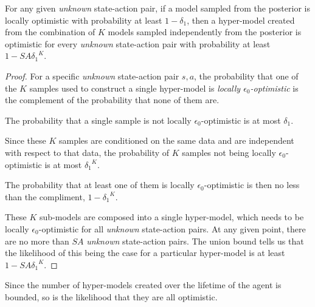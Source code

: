 \begin{lemma}
\label{sec:boss:global-opt}
For any given \emph{unknown} state-action pair, if a model sampled from the posterior is locally optimistic with probability at least $1-\delta_1$, then a hyper-model created from the combination of $K$ models sampled independently from the posterior is optimistic for every \emph{unknown} state-action pair with probability at least $1-SA{\delta_1}^K$. 
\end{lemma}
\begin{proof}
For a specific \emph{unknown} state-action pair $s,a$, the probability that one of the $K$ samples used to construct a single hyper-model is \emph{locally $\epsilon_0$-optimistic} is the complement of the probability that none of them are.

The probability that a single sample is not {locally $\epsilon_0$-optimistic} is at most $\delta_1$.

Since these $K$ samples are conditioned on the same data and are independent with respect to that data, the probability of $K$ samples not being {locally $\epsilon_0$-optimistic} is at most ${\delta_1}^K$.

The probability that at least one of them is {locally $\epsilon_0$-optimistic} is then no less than the compliment, $1-{\delta_1}^K$.

These $K$ sub-models are composed into a single hyper-model, which needs to be {locally $\epsilon_0$-optimistic} for all \emph{unknown} state-action pairs. At any given point, there are no more than $S A$ \emph{unknown} state-action pairs. The union bound tells us that the likelihood of this being the case for a particular hyper-model is at least $1-SA{\delta_1}^K$.
\end{proof}

Since the number of hyper-models created over the lifetime of the agent is bounded, so is the likelihood that they are all optimistic.

